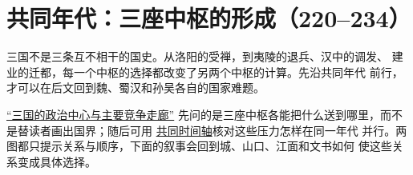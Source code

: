 \chapter{共同年代：三座中枢的形成（220--234）}
\label{ch:three-centers}




三国不是三条互不相干的国史。从洛阳的受禅，到夷陵的退兵、汉中的调发、
建业的迁都，每一个中枢的选择都改变了另两个中枢的计算。先沿共同年代
前行，才可以在后文回到魏、蜀汉和孙吴各自的国家难题。

\hyperref[fig:vol02b:polity-corridors]{“三国的政治中心与主要竞争走廊”}
先问的是三座中枢各能把什么送到哪里，而不是替读者画出国界；随后可用
\hyperref[fig:vol02b:period-timeline]{共同时间轴}核对这些压力怎样在同一年代
并行。两图都只提示关系与顺序，下面的叙事会回到城、山口、江面和文书如何
使这些关系变成具体选择。


